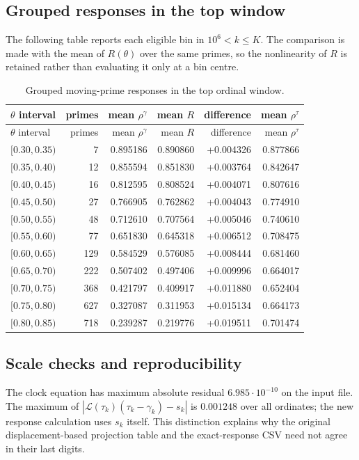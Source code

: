 \documentclass[11pt,reqno]{amsart}
\numberwithin{equation}{section}
\theoremstyle{plain}
\theoremstyle{definition}
\theoremstyle{remark}
\newcommand{\lL}{\mathcal L}
\begin{document}
\subsection{Grouped responses in the top window}
The following table reports each eligible bin in $10^6<k\le K$. The comparison is made with the mean of $R(\theta)$ over the same primes, so the nonlinearity of $R$ is retained rather than evaluating it only at a bin centre.
\begin{center}\small
\begin{longtable}{lrrrrr}
\caption{Grouped moving-prime responses in the top ordinal window.}\label{tab:response_bins}\\
\toprule
$\theta$ interval & primes & mean $\rho^\gamma$ & mean $R$ & difference & mean $\rho^\tau$\\
\midrule\endfirsthead
\toprule
$\theta$ interval & primes & mean $\rho^\gamma$ & mean $R$ & difference & mean $\rho^\tau$\\
\midrule\endhead
$[0.30,0.35)$ & 7 & 0.895186 & 0.890860 & +0.004326 & 0.877866\\
$[0.35,0.40)$ & 12 & 0.855594 & 0.851830 & +0.003764 & 0.842647\\
$[0.40,0.45)$ & 16 & 0.812595 & 0.808524 & +0.004071 & 0.807616\\
$[0.45,0.50)$ & 27 & 0.766905 & 0.762862 & +0.004043 & 0.774910\\
$[0.50,0.55)$ & 48 & 0.712610 & 0.707564 & +0.005046 & 0.740610\\
$[0.55,0.60)$ & 77 & 0.651830 & 0.645318 & +0.006512 & 0.708475\\
$[0.60,0.65)$ & 129 & 0.584529 & 0.576085 & +0.008444 & 0.681460\\
$[0.65,0.70)$ & 222 & 0.507402 & 0.497406 & +0.009996 & 0.664017\\
$[0.70,0.75)$ & 368 & 0.421797 & 0.409917 & +0.011880 & 0.652404\\
$[0.75,0.80)$ & 627 & 0.327087 & 0.311953 & +0.015134 & 0.664173\\
$[0.80,0.85)$ & 718 & 0.239287 & 0.219776 & +0.019511 & 0.701474\\
\bottomrule
\end{longtable}\end{center}
\subsection{Scale checks and reproducibility}
The clock equation has maximum absolute residual $6.985\cdot10^{-10}$ on the input file. The maximum of $|\lL(\tau_k)(\tau_k-\gamma_k)-s_k|$ is $0.001248$ over all ordinates; the new response calculation uses $s_k$ itself. This distinction explains why the original displacement-based projection table and the exact-response CSV need not agree in their last digits.
\end{document}
